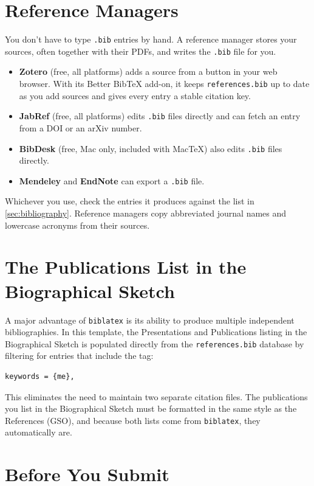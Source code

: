 \section{Reference Managers}
\label{sec:refmanagers}
You don't have to type \texttt{.bib} entries by hand. A reference manager stores your sources, often together with their PDFs, and writes the \texttt{.bib} file for you.
\begin{itemize}
\item \textbf{Zotero} (free, all platforms) adds a source from a button in your web browser. With its Better BibTeX add-on, it keeps \texttt{references.bib} up to date as you add sources and gives every entry a stable citation key.
\item \textbf{JabRef} (free, all platforms) edits \texttt{.bib} files directly and can fetch an entry from a DOI or an arXiv number.
\item \textbf{BibDesk} (free, Mac only, included with MacTeX) also edits \texttt{.bib} files directly.
\item \textbf{Mendeley} and \textbf{EndNote} can export a \texttt{.bib} file.
\end{itemize}
Whichever you use, check the entries it produces against the list in \cref{sec:bibliography}. Reference managers copy abbreviated journal names and lowercase acronyms from their sources.

\section{The Publications List in the Biographical Sketch}
\label{sec:publist}
A major advantage of \texttt{biblatex} is its ability to produce multiple independent bibliographies. In this template, the Presentations and Publications listing in the Biographical Sketch is populated directly from the \texttt{references.bib} database by filtering for entries that include the tag:
\begin{verbatim}
keywords = {me},
\end{verbatim}
This eliminates the need to maintain two separate citation files. The publications you list in the Biographical Sketch must be formatted in the same style as the References (GSO), and because both lists come from \texttt{biblatex}, they automatically are.

\section{Before You Submit}
\label{sec:checklist}

